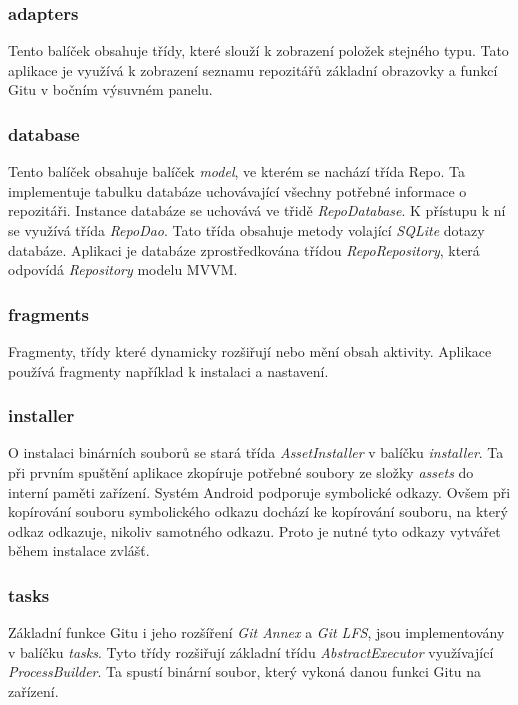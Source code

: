         \subsubsection{adapters}
        Tento balíček obsahuje třídy, které slouží k zobrazení položek stejného typu. Tato aplikace je využívá k zobrazení seznamu repozitářů základní obrazovky a funkcí Gitu v bočním výsuvném panelu.  

        \subsubsection{database}
        Tento balíček obsahuje balíček \emph{model}, ve kterém se nachází třída Repo. Ta implementuje tabulku databáze uchovávající všechny potřebné informace o repozitáři. Instance databáze se uchovává ve třidě \emph{RepoDatabase}. K přístupu k ní se využívá třída \emph{RepoDao}. Tato třída obsahuje metody volající \emph{SQLite} dotazy databáze. Aplikaci je databáze zprostředkována třídou \emph{RepoRepository}, která odpovídá \emph{Repository} modelu MVVM.

        \subsubsection{fragments}
        Fragmenty, třídy které dynamicky rozšiřují nebo mění obsah aktivity. Aplikace používá fragmenty například k instalaci a nastavení.

        \subsubsection{installer}
        O instalaci binárních souborů se stará třída \emph{AssetInstaller} v balíčku \emph{installer}. Ta při prvním spuštění aplikace zkopíruje potřebné soubory ze složky \emph{assets} do interní paměti zařízení. Systém Android podporuje symbolické odkazy. Ovšem při kopírování souboru symbolického odkazu dochází ke kopírování souboru, na který odkaz odkazuje, nikoliv samotného odkazu. Proto je nutné tyto odkazy vytvářet během instalace zvlášť.

        \subsubsection{tasks}
        Základní funkce Gitu i jeho rozšíření \emph{Git Annex} a \emph{Git LFS}, jsou implementovány v balíčku \emph{tasks}. Tyto třídy rozšiřují základní třídu \emph{AbstractExecutor} využívající \emph{ProcessBuilder}. Ta spustí binární soubor, který vykoná danou funkci Gitu na zařízení.

